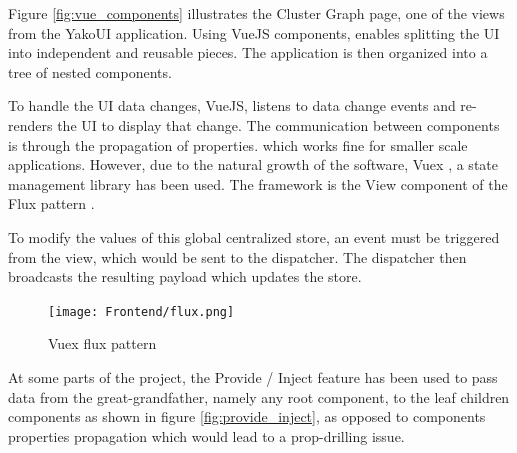             Figure \ref{fig:vue_components} illustrates the Cluster Graph page, one of the views from the YakoUI application. Using VueJS components, enables splitting the UI into independent and reusable pieces. The application is then organized into a tree of nested components.
        
            To handle the UI data changes, VueJS, listens to data change events and re-renders the UI to display that change. The communication between components is through the propagation of properties. which works fine for smaller scale applications. However, due to the natural growth of the software, Vuex \cite{vuejs_what_nodate}, a state management library has been used. The framework is the View component of the Flux pattern \cite{facebook_flux_nodate}.
            
            To modify the values of this global centralized store, an event must be triggered from the view, which would be sent to the dispatcher. The dispatcher then broadcasts the resulting payload which updates the store.
            
            \begin{figure}[H]
                \centering
                \texttt{[image: Frontend/flux.png]}
                \caption{Vuex flux pattern}
                \label{fig:flux}
            \end{figure}
            
            At some parts of the project, the Provide / Inject \cite{vuejs_provide_nodate} feature has been used to pass data from the great-grandfather, namely any root component, to the leaf children components as shown in figure \ref{fig:provide_inject}, as opposed to components properties propagation which would lead to a prop-drilling issue.

